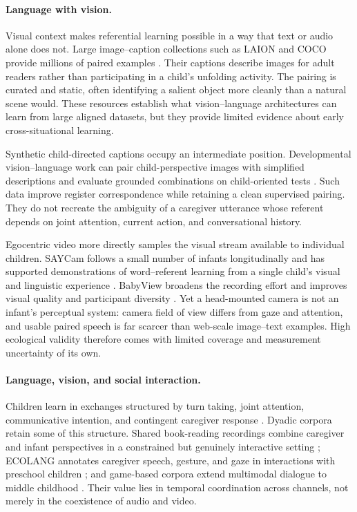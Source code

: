 \paragraph{Language with vision.}
Visual context makes referential learning possible in a way that text or audio alone does not. Large image--caption collections such as LAION and COCO provide millions of paired examples \citep{schuhmann2022laion,lin_microsoft_2014}. Their captions describe images for adult readers rather than participating in a child's unfolding activity. The pairing is curated and static, often identifying a salient object more cleanly than a natural scene would. These resources establish what vision--language architectures can learn from large aligned datasets, but they provide limited evidence about early cross-situational learning.

Synthetic child-directed captions occupy an intermediate position. Developmental vision--language work can pair child-perspective images with simplified descriptions and evaluate grounded combinations on child-oriented tests \citep{Wang2025}. Such data improve register correspondence while retaining a clean supervised pairing. They do not recreate the ambiguity of a caregiver utterance whose referent depends on joint attention, current action, and conversational history.

Egocentric video more directly samples the visual stream available to individual children. SAYCam follows a small number of infants longitudinally and has supported demonstrations of word--referent learning from a single child's visual and linguistic experience \citep{sullivan_saycam_2022,vong2024grounded}. BabyView broadens the recording effort and improves visual quality and participant diversity \citep{Long2024}. Yet a head-mounted camera is not an infant's perceptual system: camera field of view differs from gaze and attention, and usable paired speech is far scarcer than web-scale image--text examples. High ecological validity therefore comes with limited coverage and measurement uncertainty of its own.

\paragraph{Language, vision, and social interaction.}
Children learn in exchanges structured by turn taking, joint attention, communicative intention, and contingent caregiver response \citep{Tomasello1995,Csibra2009}. Dyadic corpora retain some of this structure. Shared book-reading recordings combine caregiver and infant perspectives in a constrained but genuinely interactive setting \citep{ahamat2025shared}; ECOLANG annotates caregiver speech, gesture, and gaze in interactions with preschool children \citep{gu2025ecolang}; and game-based corpora extend multimodal dialogue to middle childhood \citep{bodur_chico_2021,goumri_chica_2024}. Their value lies in temporal coordination across channels, not merely in the coexistence of audio and video.

